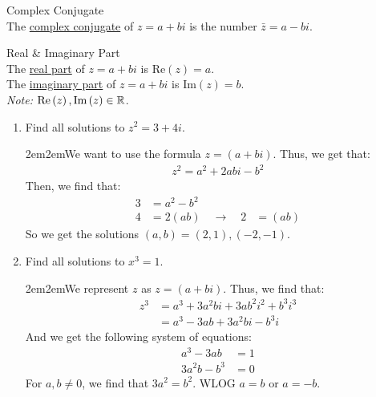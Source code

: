 \documentclass[10pt]{paper}
\newcommand{\real}[1]{\text{Re}\left(#1\right)}
\newcommand{\im}[1]{\text{Im}\left(#1\right)}
\newcommand{\gspc}{\vspace{0.13cm}} %
\newcommand{\gline}[0]{\gspc\\} %
\newcommand{\ul}[1]{\underline{#1}}
\let\endoldproof\endproof
\newenvironment{problem}[1]
  {\vspace{-0.1cm}\begin{coloredadjust}\begin{adjustwidth}{2em}{2em}#1}
  {\endoldproof
\end{adjustwidth}\end{coloredadjust}\gspc}
\begin{document}
\begin{definition}{Complex Conjugate}{}\gline{}
  The \ul{complex conjugate} of $z = a+bi$ is the number $\bar z = a - bi$. 
\end{definition}

\begin{definition}{Real \& Imaginary Part}{}\gline{}
  The \ul{real part} of $z = a+bi$ is $\real{z} = a$. \\
  The \ul{imaginary part} of $z = a+bi$ is $\im{z} = b$. \gline{}
  \textit{Note: }$\real{z},\im{z}\in \R$. 
\end{definition}

\begin{enumerate}
  \item [2.] Find all solutions to $z^2 = 3+ 4i$.
  \begin{problem}
    We want to use the formula $z = (a+bi)$. Thus, we get that:
    \begin{align*}
      z^2 = a^2 + 2abi - b^2
    \end{align*}
    Then, we find that:
    \begin{align*}
      3&= a^2 - b^2\\
      4 &= 2(ab) \quad\rightarrow \quad 2 &= (ab)
    \end{align*}
    So we get the solutions $(a,b) = (2, 1), (-2, -1)$.
  \end{problem}
  \item [3.] Find all solutions to $x^3 = 1$. 
  \begin{problem}
    We represent $z$ as $z = (a+bi)$. Thus, we find that:
    \begin{align*}
      z^3 &= a^3 + 3 a^2 b i + 3 a b^2 i^2 + b^3 i^3\\
      &= a^3 - 3ab + 3a^2bi - b^3 i
    \end{align*}
    And we get the following system of equations:
    \begin{align*}
      a^3 - 3ab &= 1\\
      3a^2b - b^3 &= 0
    \end{align*}
    For $a, b\ne 0$, we find that $3a^2 = b^2$. WLOG $a = b$ or $a = -b$. 
  \end{problem}
\end{enumerate}
\end{document}
